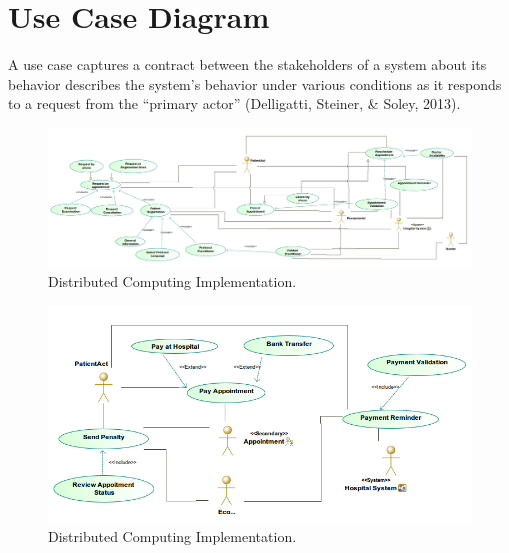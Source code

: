 \documentclass{article}
\begin{document}
            \section{Use Case Diagram}
            A use case captures a contract between the stakeholders of a system about its behavior describes the
            system’s behavior under various conditions as it responds to a request from the “primary actor”
            (Delligatti, Steiner, & Soley, 2013).
            \begin{figure}[H]
                \centering 
                \includegraphics[width=1\linewidth]{./img/appointments.png}
                \caption{Distributed Computing Implementation.}
                \label{fig:architecture}
            \end{figure}
            \begin{figure}[H]
                \centering 
                \includegraphics[width=1\linewidth]{./img/payments.png}
                \caption{Distributed Computing Implementation.}
                \label{fig:architecture}
            \end{figure}
\end{document}
